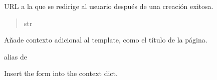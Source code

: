 \documentclass[letterpaper,10pt,spanish]{sphinxmanual}
\begin{document}
\begin{fulllineitems}
\begin{fulllineitems}
\begin{quote}
\begin{description}
\end{description}\end{quote}

\end{fulllineitems}



\begin{fulllineitems}

\pysigstartsignatures
{}
\pysigstopsignatures
\sphinxAtStartPar
URL a la que se redirige al usuario después de una creación exitosa.
\begin{quote}\begin{description}
\sphinxAtStartPar
str

\end{description}\end{quote}

\end{fulllineitems}



\begin{fulllineitems}

\pysigstartsignatures
{}
\pysigstopsignatures
\sphinxAtStartPar
Añade contexto adicional al template, como el título de la página.

\end{fulllineitems}



\begin{fulllineitems}

\pysigstartsignatures
{}
\pysigstopsignatures
\sphinxAtStartPar
alias de 

\end{fulllineitems}



\begin{fulllineitems}

\pysigstartsignatures
{}
\pysigstopsignatures
\sphinxAtStartPar
Insert the form into the context dict.

\end{fulllineitems}



\begin{fulllineitems}


\end{fulllineitems}
\end{fulllineitems}
\end{document}
